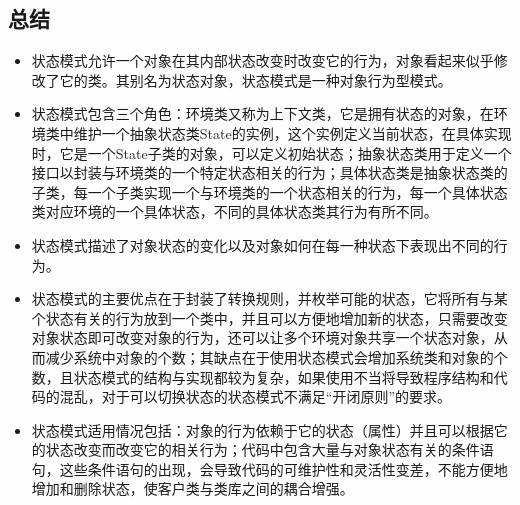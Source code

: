 \documentclass[letterpaper,10pt,english]{sphinxmanual}
\begin{document}
\subsection{总结}
\label{\detokenize{behavioral_patterns/state:id15}}\begin{itemize}
\item {} 
\sphinxAtStartPar
状态模式允许一个对象在其内部状态改变时改变它的行为，对象看起来似乎修改了它的类。其别名为状态对象，状态模式是一种对象行为型模式。

\item {} 
\sphinxAtStartPar
状态模式包含三个角色：环境类又称为上下文类，它是拥有状态的对象，在环境类中维护一个抽象状态类State的实例，这个实例定义当前状态，在具体实现时，它是一个State子类的对象，可以定义初始状态；抽象状态类用于定义一个接口以封装与环境类的一个特定状态相关的行为；具体状态类是抽象状态类的子类，每一个子类实现一个与环境类的一个状态相关的行为，每一个具体状态类对应环境的一个具体状态，不同的具体状态类其行为有所不同。

\item {} 
\sphinxAtStartPar
状态模式描述了对象状态的变化以及对象如何在每一种状态下表现出不同的行为。

\item {} 
\sphinxAtStartPar
状态模式的主要优点在于封装了转换规则，并枚举可能的状态，它将所有与某个状态有关的行为放到一个类中，并且可以方便地增加新的状态，只需要改变对象状态即可改变对象的行为，还可以让多个环境对象共享一个状态对象，从而减少系统中对象的个数；其缺点在于使用状态模式会增加系统类和对象的个数，且状态模式的结构与实现都较为复杂，如果使用不当将导致程序结构和代码的混乱，对于可以切换状态的状态模式不满足“开闭原则”的要求。

\item {} 
\sphinxAtStartPar
状态模式适用情况包括：对象的行为依赖于它的状态（属性）并且可以根据它的状态改变而改变它的相关行为；代码中包含大量与对象状态有关的条件语句，这些条件语句的出现，会导致代码的可维护性和灵活性变差，不能方便地增加和删除状态，使客户类与类库之间的耦合增强。

\end{itemize}

\sphinxstepscope
\end{document}

